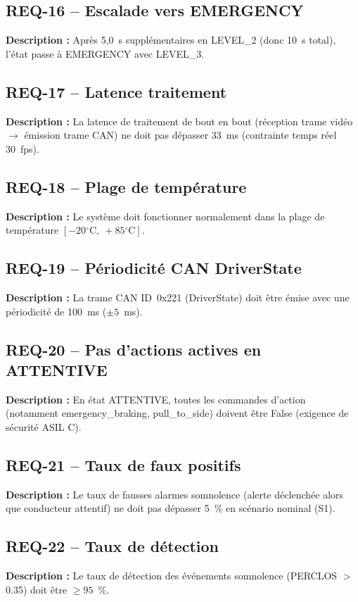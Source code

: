 \documentclass[12pt,a4paper]{report}
\newcommand{\degr}{\ensuremath{^{\circ}}}
\begin{document}
\subsection*{REQ-16 -- Escalade vers EMERGENCY}
\textbf{Description :} Apr\`es 5{,}0~s suppl\'ementaires en LEVEL\_2 (donc 10~s total), l'\'etat passe \`a EMERGENCY avec LEVEL\_3.

\subsection*{REQ-17 -- Latence traitement}
\textbf{Description :} La latence de traitement de bout en bout (r\'eception trame vid\'eo $\to$ \'emission trame CAN) ne doit pas d\'epasser 33~ms (contrainte temps r\'eel 30~fps).

\subsection*{REQ-18 -- Plage de temp\'erature}
\textbf{Description :} Le syst\`eme doit fonctionner normalement dans la plage de temp\'erature $[-20\degr\text{C},\ +85\degr\text{C}]$.

\subsection*{REQ-19 -- P\'eriodicit\'e CAN DriverState}
\textbf{Description :} La trame CAN ID~0x221 (DriverState) doit \^etre \'emise avec une p\'eriodicit\'e de 100~ms ($\pm 5$~ms).

\subsection*{REQ-20 -- Pas d'actions actives en ATTENTIVE}
\textbf{Description :} En \'etat ATTENTIVE, toutes les commandes d'action (notamment emergency\_braking, pull\_to\_side) doivent \^etre False (exigence de s\'ecurit\'e ASIL C).

\subsection*{REQ-21 -- Taux de faux positifs}
\textbf{Description :} Le taux de fausses alarmes somnolence (alerte d\'eclench\'ee alors que conducteur attentif) ne doit pas d\'epasser 5~\% en sc\'enario nominal (S1).

\subsection*{REQ-22 -- Taux de d\'etection}
\textbf{Description :} Le taux de d\'etection des \'ev\'enements somnolence (PERCLOS $>$ 0.35) doit \^etre $\geq 95$~\%.
\end{document}
